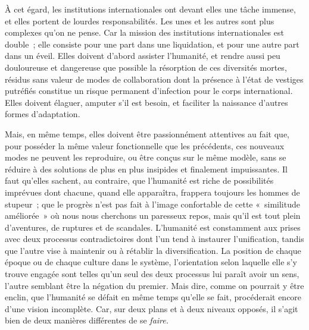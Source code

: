 \documentclass[french,twoside]{book} %
\begin{document}
À cet égard, les institutions internationales ont devant elles une tâche immense, et elles portent de lourdes responsabilités. Les unes et les autres sont plus complexes qu’on ne pense. Car la mission des institutions internationales est double ; elle consiste pour une part dans une liquidation, et pour une autre part dans un éveil. Elles doivent d’abord assister l’humanité, et rendre aussi peu douloureuse et dangereuse que possible la résorption de ces diversités mortes, résidus sans valeur de modes de collaboration dont la présence à l’état de vestiges putréfiés constitue un risque permanent d’infection pour le corps international. Elles doivent élaguer, amputer s’il est besoin, et faciliter la naissance d’autres formes d’adaptation.\par
Mais, en même temps, elles doivent être passionnément attentives au fait que, pour posséder la même valeur fonctionnelle que les précédents, ces nouveaux modes ne peuvent les reproduire, ou être conçus sur le même modèle, sans se réduire à des solutions de plus en plus insipides et finalement impuissantes. Il faut qu’elles sachent, au contraire, que l’humanité est riche de possibilités imprévues dont chacune, quand elle apparaîtra, frappera toujours les hommes de stupeur ; que le progrès n’est pas fait à l’image confortable de cette « similitude améliorée » où nous nous cherchons un paresseux repos, mais qu’il est tout plein d’aventures, de ruptures et de scandales. L’humanité est constamment aux prises avec deux processus contradictoires dont l’un tend à instaurer l’unification, tandis que l’autre vise à maintenir ou à rétablir la diversification. La position de chaque époque ou de chaque culture dans le système, l’orientation selon laquelle elle s’y trouve engagée sont telles qu’un seul des deux processus lui paraît avoir un sens, l’autre semblant être la négation du premier. Mais dire, comme on pourrait y être enclin, que l’humanité se défait en même temps qu’elle se fait, procéderait encore d’une vision incomplète. Car, sur deux plans et à deux niveaux opposés, il s’agit bien de deux manières différentes de se \emph{faire.}\par
\end{document}
